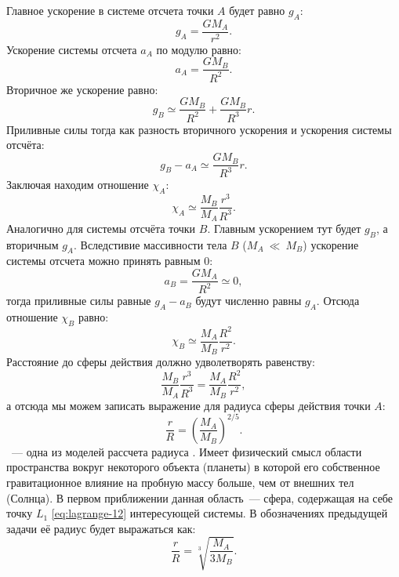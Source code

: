 Главное ускорение в системе отсчета точки $A$ будет равно $g_A$:
\begin{equation*}
	g_A = \frac{GM_A}{r^2}.
\end{equation*}
Ускорение системы отсчета $a_A$ по модулю равно:
\begin{equation*}
	a_A = \frac{GM_B}{R^2}.
\end{equation*}
Вторичное же ускорение равно:
\begin{equation*}
	g_B\simeq\frac{GM_B}{R^2}+\frac{GM_B}{R^3}r.
\end{equation*}
Приливные силы тогда как разность вторичного ускорения и ускорения системы отсчёта:
\begin{equation*}
	g_B-a_A \simeq \frac{G M_B}{R^3} r.
\end{equation*} 
Заключая находим отношение $\chi_A$:
\begin{equation*}
	\chi_A\simeq\frac{M_B}{M_A} \frac{r^3}{R^3}.
\end{equation*}
Аналогично для системы отсчёта точки $B$. Главным ускорением тут будет $g_B$, а вторичным $g_A$. Вследстивие массивности тела $B$ ($M_A~\ll~M_B$) ускорение системы отсчета можно принять равным 0:
\begin{equation*}
	a_B=\frac{G M_A}{R^2} \simeq 0,
\end{equation*}
тогда приливные силы равные $g_A-a_B$ будут численно равны $g_A$. Отсюда отношение $\chi_B$ равно:
\begin{equation*}
	\chi_B \simeq \frac{M_A}{M_B} \frac{R^2}{r^2}.
\end{equation*}
Расстояние до сферы действия должно удволетворять равенству:
\begin{equation*}
	\frac{M_B}{M_A} \frac{r^3}{R^3}=\frac{M_A}{M_B} \frac{R^2}{r^2},
\end{equation*}
а отсюда мы можем записать выражение для радиуса сферы действия точки $A$:
\begin{equation}
	\frac{r}{R}=\left(\frac{M_A}{M_B}\right)^{2 / 5}.
\end{equation} 
~--- одна из моделей рассчета радиуса . Имеет физический смысл области пространства вокруг некоторого объекта (планеты) в которой его собственное гравитационное влияние на пробную массу больше, чем от внешних тел (Солнца). В первом приближении данная область~--- сфера, содержащая на себе точку $L_1$ \eqref{eq:lagrange-12} интересующей системы. В обозначениях предыдущей задачи её радиус будет выражаться как:
\begin{equation}
	\frac{r}{R} = \sqrt[3]{\frac{M_A}{3M_B}}.
\end{equation}
